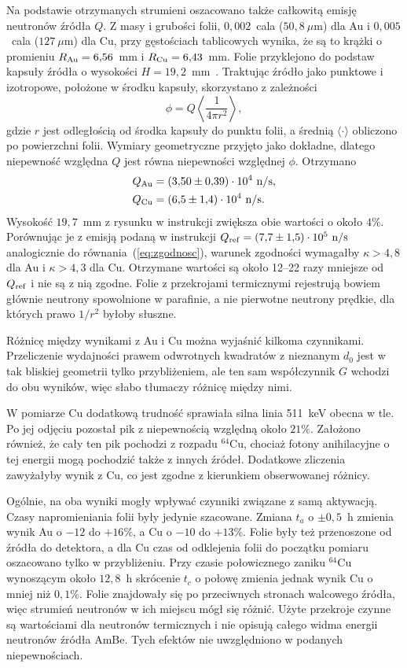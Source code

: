 \documentclass[twocolumn,a4paper,10pt]{article}
\begin{document}
Na podstawie otrzymanych strumieni oszacowano także
całkowitą emisję neutronów źródła $Q$. Z masy i grubości
folii, $0{,}002$~cala ($50{,}8~\mu$m) dla Au
i $0{,}005$~cala ($127~\mu$m) dla Cu, przy gęstościach
tablicowych wynika, że są to krążki o promieniu
$R_{\rm Au}=6{,}56$~mm i $R_{\rm Cu}=6{,}43$~mm.
Folie przyklejono do podstaw kapsuły źródła o wysokości
$H=19{,}2$~mm~\cite{z40}. Traktując źródło jako punktowe
i izotropowe, położone w środku kapsuły, skorzystano
z zależności
\begin{equation}
\phi=Q\left\langle\frac{1}{4\pi r^2}\right\rangle,
\label{eq:Q}
\end{equation}
gdzie $r$ jest odległością od środka kapsuły do punktu
folii, a średnią $\langle\cdot\rangle$ obliczono po
powierzchni folii. Wymiary geometryczne przyjęto jako
dokładne, dlatego niepewność względna $Q$ jest równa
niepewności względnej $\phi$. Otrzymano
\begin{align}
Q_{\rm Au}&=(3{,}50\pm0{,}39)\cdot10^4~\mathrm{n/s},\\
Q_{\rm Cu}&=(6{,}5\pm1{,}4)\cdot10^4~\mathrm{n/s}.
\label{eq:Qresults}
\end{align}
Wysokość $19{,}7$~mm z rysunku w instrukcji
zwiększa obie wartości o około $4\%$.
Porównując je z emisją podaną w instrukcji
$Q_{\rm ref}=(7{,}7\pm1{,}5)\cdot10^5~\mathrm{n/s}$~\cite{z40}
analogicznie do równania~(\ref{eq:zgodnosc}), warunek
zgodności wymagałby $\kappa>4{,}8$ dla Au i $\kappa>4{,}3$
dla Cu. Otrzymane wartości są około
12--22 razy mniejsze od $Q_{\rm ref}$ i nie są
z nią zgodne. Folie z przekrojami termicznymi
rejestrują bowiem głównie neutrony spowolnione
w parafinie, a nie pierwotne neutrony prędkie,
dla których prawo $1/r^2$ byłoby słuszne.

Różnicę między wynikami z Au i Cu można wyjaśnić kilkoma czynnikami.
Przeliczenie wydajności prawem odwrotnych kwadratów
z nieznanym $d_0$ jest w tak bliskiej geometrii tylko
przybliżeniem, ale ten sam współczynnik $G$ wchodzi
do obu wyników, więc słabo tłumaczy różnicę między nimi.

W pomiarze Cu dodatkową trudność sprawiała silna
linia 511~keV obecna w tle. Po jej odjęciu pozostał
pik z niepewnością względną około $21\%$. Założono
również, że cały ten pik pochodzi z rozpadu
$^{64}$Cu, chociaż fotony anihilacyjne o tej energii
mogą pochodzić także z innych źródeł. Dodatkowe
zliczenia zawyżałyby wynik z Cu, co jest zgodne
z kierunkiem obserwowanej różnicy.

Ogólnie, na oba wyniki mogły wpływać czynniki
związane z samą aktywacją. Czasy napromieniania
folii były jedynie szacowane. Zmiana $t_a$
o $\pm0{,}5$~h zmienia wynik Au o $-12$ do $+16\%$,
a Cu o $-10$ do $+13\%$. Folie były też przenoszone
od źródła do detektora, a dla Cu czas od odklejenia
folii do początku pomiaru oszacowano tylko
w przybliżeniu. Przy czasie połowicznego zaniku
$^{64}$Cu wynoszącym około $12{,}8$~h skrócenie
$t_c$ o połowę zmienia jednak wynik Cu
o mniej niż $0{,}1\%$. Folie znajdowały się po przeciwnych
stronach walcowego źródła, więc strumień neutronów
w ich miejscu mógł się różnić. Użyte przekroje
czynne są wartościami dla neutronów termicznych
i nie opisują całego widma energii neutronów
źródła AmBe. Tych efektów nie uwzględniono
w podanych niepewnościach.
\end{document}
